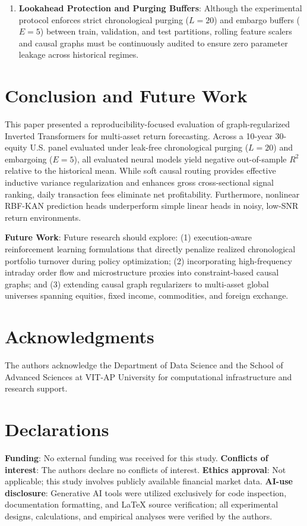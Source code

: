 \documentclass[10pt,twocolumn,a4paper]{article}
\begin{document}
\begin{enumerate}
    \item \textbf{Lookahead Protection and Purging Buffers}: Although the experimental protocol enforces strict chronological purging ($L=20$) and embargo buffers ($E=5$) between train, validation, and test partitions, rolling feature scalers and causal graphs must be continuously audited to ensure zero parameter leakage across historical regimes.
\end{enumerate}

\pagebreak
\section{Conclusion and Future Work}
This paper presented a reproducibility-focused evaluation of graph-regularized Inverted Transformers for multi-asset return forecasting. Across a 10-year 30-equity U.S. panel evaluated under leak-free chronological purging ($L=20$) and embargoing ($E=5$), all evaluated neural models yield negative out-of-sample $R^2$ relative to the historical mean. While soft causal routing provides effective inductive variance regularization and enhances gross cross-sectional signal ranking, daily transaction fees eliminate net profitability. Furthermore, nonlinear RBF-KAN prediction heads underperform simple linear heads in noisy, low-SNR return environments.

\textbf{Future Work}: Future research should explore: (1) execution-aware reinforcement learning formulations that directly penalize realized chronological portfolio turnover during policy optimization; (2) incorporating high-frequency intraday order flow and microstructure proxies into constraint-based causal graphs; and (3) extending causal graph regularizers to multi-asset global universes spanning equities, fixed income, commodities, and foreign exchange.

\section*{Acknowledgments}
The authors acknowledge the Department of Data Science and the School of Advanced Sciences at VIT-AP University for computational infrastructure and research support.

\section*{Declarations}
\noindent\textbf{Funding}: No external funding was received for this study. \textbf{Conflicts of interest}: The authors declare no conflicts of interest. \textbf{Ethics approval}: Not applicable; this study involves publicly available financial market data. \textbf{AI-use disclosure}: Generative AI tools were utilized exclusively for code inspection, documentation formatting, and LaTeX source verification; all experimental designs, calculations, and empirical analyses were verified by the authors.
\end{document}
